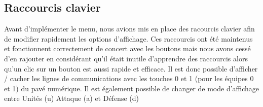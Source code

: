 			\clearpage

		\subsection{Raccourcis clavier}
			Avant d'implémenter le menu, nous avions mis en place des racourcis clavier afin de modifier rapidement les options d'affichage.
			Ces raccourcis ont été maintenus et fonctionnent correctement de concert avec les boutons mais nous avons cessé d'en rajouter 
			en considérant qu'il était inutile d'apprendre des raccourcis alors qu'un clic sur un bouton est aussi rapide et efficace.
			Il est donc possible d'afficher / cacher les lignes de communications avec les touches 0 et 1 (pour les équipes 0 et 1) du pavé numérique.
			Il est également possible de changer de mode d'affichage entre Unités (u) Attaque (a) et Défense (d)
